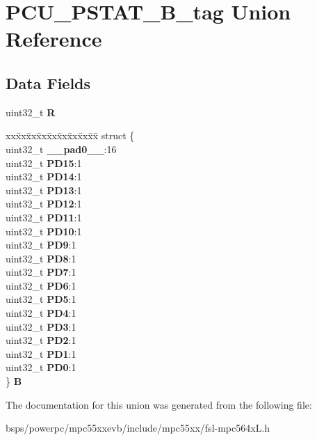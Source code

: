 \hypertarget{unionPCU__PSTAT__32B__tag}{}\section{P\+C\+U\+\_\+\+P\+S\+T\+A\+T\+\_\+B\+\_\+tag Union Reference}
\label{unionPCU__PSTAT__32B__tag}
\subsection*{Data Fields}
\begin{DoxyCompactItemize}
\item 
\mbox{\label{unionPCU__PSTAT__32B__tag_afecf0f11d0d64e0cb6f4c13c5e658009}} 
uint32\+\_\+t {\bfseries R}
\item 
\mbox{\label{unionPCU__PSTAT__32B__tag_a8cd9a9b22808ded33b7ae59fa23a3dc9}} 
\begin{tabbing}
xx\=xx\=xx\=xx\=xx\=xx\=xx\=xx\=xx\=\kill
struct \{\\
\>uint32\_t {\bfseries \_\_pad0\_\_}:16\\
\>uint32\_t {\bfseries PD15}:1\\
\>uint32\_t {\bfseries PD14}:1\\
\>uint32\_t {\bfseries PD13}:1\\
\>uint32\_t {\bfseries PD12}:1\\
\>uint32\_t {\bfseries PD11}:1\\
\>uint32\_t {\bfseries PD10}:1\\
\>uint32\_t {\bfseries PD9}:1\\
\>uint32\_t {\bfseries PD8}:1\\
\>uint32\_t {\bfseries PD7}:1\\
\>uint32\_t {\bfseries PD6}:1\\
\>uint32\_t {\bfseries PD5}:1\\
\>uint32\_t {\bfseries PD4}:1\\
\>uint32\_t {\bfseries PD3}:1\\
\>uint32\_t {\bfseries PD2}:1\\
\>uint32\_t {\bfseries PD1}:1\\
\>uint32\_t {\bfseries PD0}:1\\
\} {\bfseries B}\\

\end{tabbing}\end{DoxyCompactItemize}


The documentation for this union was generated from the following file\+:\begin{DoxyCompactItemize}
\item 
bsps/powerpc/mpc55xxevb/include/mpc55xx/fsl-\/mpc564x\+L.\+h\end{DoxyCompactItemize}
